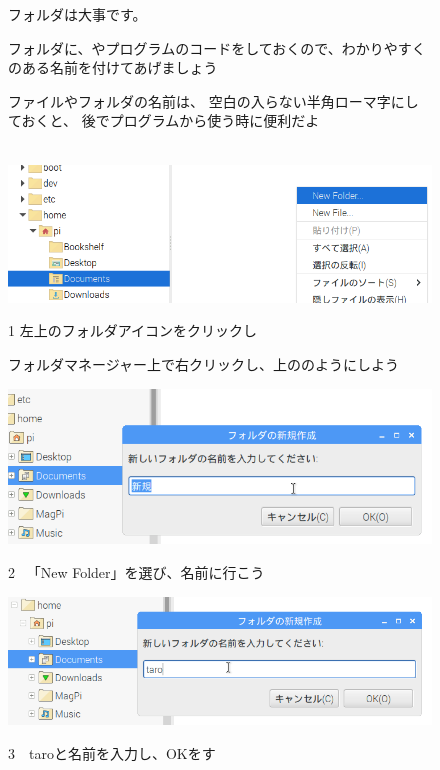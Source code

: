 \documentclass[a4paper,12pt]{jarticle}
\begin{document}
\begin{figure}[hb]
  \centering
  \begin{minipage}{0.8\textwidth}
    {	\large
      フォルダは大事です。

      フォルダに、やプログラムのコードをしておくので、わかりやすくのある名前を付けてあげましょう

      \bigskip
      ファイルやフォルダの名前は、
      空白の入らない半角ローマ字にしておくと、
      後でプログラムから使う時に便利だよ
    }
  \end{minipage}
\end{figure}
\clearpage
\begin{figure}[ht]
  \vspace{8mm}\\
  \centering
  \includegraphics[width=13.33cm]{textbook-img034.png}
  \begin{minipage}{\textwidth}
    1
    左上のフォルダアイコンをクリックし

    フォルダマネージャー上で右クリックし、上ののようにしよう
  \end{minipage}

  \centering
  \includegraphics[width=12.483cm]{textbook-img036.png}
  \begin{minipage}{\textwidth}
    2
    \ 「New Folder」を選び、名前に行こう
  \end{minipage}

  \centering
  \includegraphics[width=12.776cm]{textbook-img039.png}
  \begin{minipage}{\textwidth}
    3　taroと名前を入力し、OKをす
  \end{minipage}


\end{figure}
\end{document}
